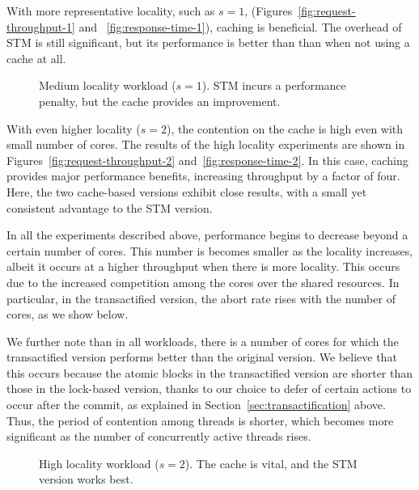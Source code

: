 \documentclass[preprint,11pt]{sigplanconf}
\begin{document}
With more representative locality, such as $s=1$, 
(Figures~\ref{fig:request-throughput-1} and ~\ref{fig:response-time-1}), 
caching is beneficial. The overhead
of STM is still significant, but its performance is better than
than when not using a cache at all. 

\begin{figure}
 \centering
 \hfill
 \caption{Medium locality workload ($s = 1$). 
 STM incurs a performance penalty, but the cache provides an improvement.}
\end{figure}

With even higher locality ($s=2$), the contention on the cache is high even with
small number of cores. The results of the high locality experiments are shown
in Figures~\ref{fig:request-throughput-2} and~\ref{fig:response-time-2}.
In this case, caching provides major performance
benefits, increasing throughput by a factor of four. Here, the two 
cache-based versions exhibit close results, with a small yet consistent
advantage to the STM version.

In all the experiments described above, performance begins to decrease
beyond a certain number of cores. This number is becomes smaller as 
the locality increases, albeit it occurs at a higher throughput when
there is more locality. This occurs due to the increased competition
among the cores over the shared resources. In particular, in the 
transactified version, the abort rate rises with the number of cores,
as we show below. 

We further note than in all workloads, there is 
a number of cores for which the transactified version performs 
better than the original version. We believe that this occurs 
because the atomic blocks in the transactified version are 
shorter than those in the lock-based version, thanks to our
choice to defer of certain actions to occur after the commit,
as explained in Section~\ref{sec:transactification} above.
Thus, the period of contention among threads is shorter,
which becomes more significant as the number of concurrently
active threads rises.

\begin{figure}
 \centering
 \hfill
 \caption{High locality workload ($s = 2$). The cache is vital, and 
 the STM version works best.}
\end{figure}
\end{document}
